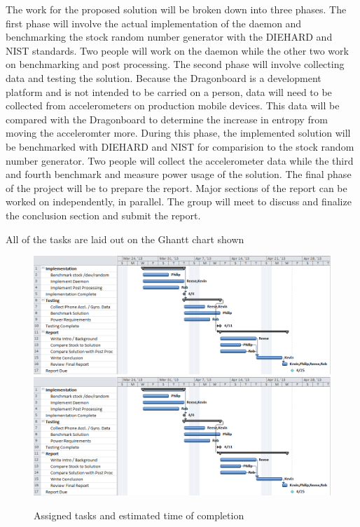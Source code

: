 
The work for the proposed solution will be broken down into three phases.  The first phase will involve the actual implementation of the daemon and benchmarking the stock random number generator with the DIEHARD and NIST standards.  Two people will work on the daemon while the other two work on benchmarking and post processing.  The second phase will involve collecting data and testing the solution.  Because the Dragonboard is a development platform and is not intended to be carried on a person, data will need to be collected from accelerometers on production mobile devices.  This data will be compared with the Dragonboard to determine the increase in entropy from moving the acceleromter more.  During this phase, the implemented solution will be benchmarked with DIEHARD and NIST for comparision to the stock random number generator.  Two people will collect the accelerometer data while the third and fourth benchmark and measure power usage of the solution.  The final phase of the project will be to prepare the report.  Major sections of the report can be worked on independently, in parallel.  The group will meet to discuss and finalize the conclusion section and submit the report.  

All of the tasks are laid out on the Ghantt chart shown

\begin{figure}[t]
	\includegraphics[]{proj-ghantt-v3}
	\includegraphics[]{proj-ghantt-v3}
	\caption{Assigned tasks and estimated time of completion}
	\label{Ghantt Chart}
\end{figure}
